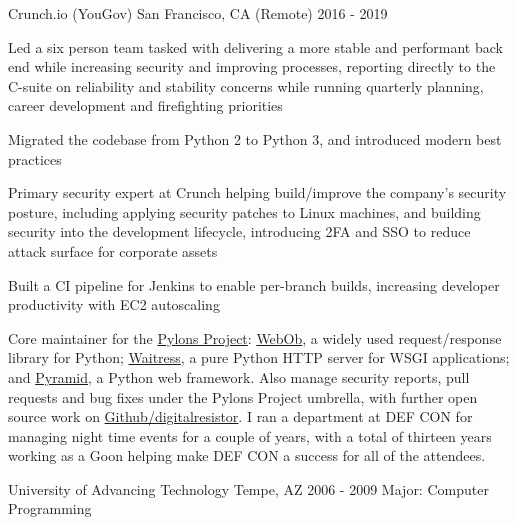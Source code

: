 \documentclass{resume}
\begin{document}
            {Crunch.io (YouGov)}
            {San Francisco, CA (Remote)}
            {2016 - 2019}
\begin{resumeItems}
\item Led a six person team tasked with delivering a more stable and performant back end while increasing security and improving processes, reporting directly to the C-suite on reliability and stability concerns while running quarterly planning, career development and firefighting priorities
\item Migrated the codebase from Python 2 to Python 3, and introduced modern best practices
\item Primary security expert at Crunch helping build/improve the company's security posture, including applying security patches to Linux machines, and building security into the development lifecycle, introducing 2FA and SSO to reduce attack surface for corporate assets
\item Built a CI pipeline for Jenkins to enable per-branch builds, increasing developer productivity with EC2 autoscaling
\end{resumeItems}

 Core maintainer for the
\href{https://pylonsproject.org}{Pylons Project}:
\href{https://github.com/Pylons/webob}{WebOb}, a widely used request/response
library for Python; \href{https://github.com/Pylons/waitress}{Waitress}, a pure
Python HTTP server for WSGI applications; and
\href{https://github.com/Pylons/pyramid}{Pyramid}, a Python web framework. Also
manage security reports, pull requests and bug fixes under the Pylons Project
umbrella, with further open source work on
\href{https://github.com/digitalresistor}{Github/digitalresistor}.
 I ran a department at DEF CON for managing night time
events for a couple of years, with a total of thirteen years working as a Goon
helping make DEF CON a success for all of the attendees.

            {University of Advancing Technology}
            {Tempe, AZ}
            {2006 - 2009}
Major: Computer Programming
\end{document}
